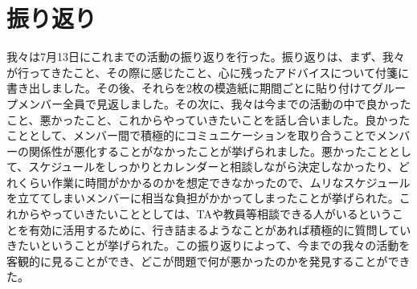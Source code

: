 \chapter{振り返り}
我々は7月13日にこれまでの活動の振り返りを行った。振り返りは、まず、我々が行ってきたこと、その際に感じたこと、心に残ったアドバイスについて付箋に書き出しました。その後、それらを2枚の模造紙に期間ごとに貼り付けてグループメンバー全員で見返しました。その次に、我々は今までの活動の中で良かったこと、悪かったこと、これからやっていきたいことを話し合いました。良かったこととして、メンバー間で積極的にコミュニケーションを取り合うことでメンバーの関係性が悪化することがなかったことが挙げられました。悪かったこととして、スケジュールをしっかりとカレンダーと相談しながら決定しなかったり、どれくらい作業に時間がかかるのかを想定できなかったので、ムリなスケジュールを立ててしまいメンバーに相当な負担がかかってしまったことが挙げられた。これからやっていきたいこととしては、TAや教員等相談できる人がいるということを有効に活用するために、行き詰まるようなことがあれば積極的に質問していきたいということが挙げられた。この振り返りによって、今までの我々の活動を客観的に見ることができ、どこが問題で何が悪かったのかを発見することができた。
